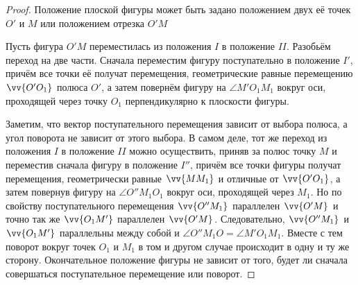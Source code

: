 \begin{proof}
  Положение плоской фигуры может быть задано положением двух её точек $O'$ и
  $M$ или положением отрезка $O'M$

  \begin{figure}[H]
    \centering

    \caption{}
    \label{fig:15_1}
  \end{figure}

  Пусть фигура $O'M$ переместилась из положения $I$ в положение $II$. Разобьём
  переход на две части. Сначала переместим фигуру поступательно в положение
  $I'$, причём все точки её получат перемещения, геометрические равные
  перемещению $\vv{O'O_1}$ полюса $O'$, а затем повернём фигуру на $\angle M'O_1
  M_1$ вокруг оси, проходящей через точку $O_1$ перпендикулярно к плоскости
  фигуры.

  Заметим, что вектор поступательного перемещения зависит от выбора полюса, а
  угол поворота не зависит от этого выбора. В самом деле, тот же переход из
  положения $I$ в положение $II$ можно осуществить, приняв за полюс точку $M$ и
  переместив сначала фигуру в положение $I''$, причём все точки фигуры получат
  перемещения, геометрически равные $\vv{M M_1}$ и отличные от $\vv{O' O_1}$,
  а затем повернув фигуру на $\angle O'' M_1 O_1$ вокруг оси, проходящей через
  $M_1$. Но по свойству поступательного перемещения $\vv{O'' M_1}$ параллелен
  $\vv{O' M}$ и точно так же $\vv{O_1 M'}$ параллелен $\vv{O'M}$. Следовательно,
  $\vv{O'' M_1}$ и $\vv{O_1 M'}$ параллельны между собой и
  $\angle O'' M_1 O = \angle M' O_1 M_1$. Вместе с тем поворот вокруг точек
  $O_1$ и $M_1$ в том и другом случае происходит в одну и ту же сторону.
  Окончательное положение фигуры не зависит от того, будет ли сначала
  совершаться поступательное перемещение или поворот.


\end{proof}
